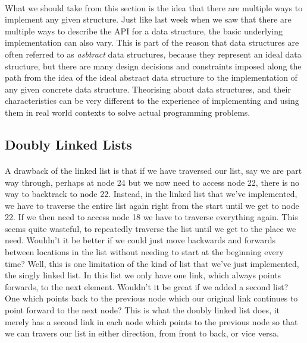\documentclass[10pt, a4paper, twosize]{article}
\begin{document}
\paragraph{} What we should take from this section is the idea that there are multiple ways to implement any given structure. Just like last week when we saw that there are multiple ways to describe the API for a data structure, the basic underlying implementation can also vary. This is part of the reason that data structures are often referred to as \emph{asbtract} data structures, because they represent an ideal data structure, but there are many design decisions and constraints imposed along the path from the idea of the ideal abstract data structure to the implementation of any given concrete data structure. Theorising about data structures, and their characteristics can be very different to the experience of implementing and using them in real world contexts to solve actual programming problems.

\subsection{Doubly Linked Lists}
\paragraph{} A drawback of the linked list is that if we have traversed our list, say we are part way through, perhaps at node 24 but we now need to access node 22, there is no way to backtrack to node 22. Instead, in the linked list that we've implemented, we have to traverse the entire list again right from the start until we get to node 22. If we then need to access node 18 we have to traverse everything again. This seems quite wasteful, to repeatedly traverse the list until we get to the place we need. Wouldn't it be better if we could just move backwards and forwards between locations in the list without needing to start at the beginning every time? Well, this is one limitation of the kind of list that we've just implemented, the singly linked list. In this list we only have one link, which always points forwards, to the next element. Wouldn't it be great if we added a second list? One which points back to the previous node which our original link continues to point forward to the next node? This is what the doubly linked list does, it merely has a second link in each node which points to the previous node so that we can travers our list in either direction, from front to back, or vice versa.
\end{document}
